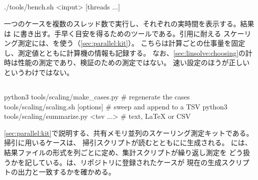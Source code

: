\subsection{}

\begin{shell}
./tools/bench.sh <input> [threads ...]
\end{shell}

一つのケースを複数のスレッド数で実行し、それぞれの実時間を表示する。結果は
に書き出す。手早く目安を得るためのツールである。引用に耐える
スケーリング測定には、を使う（\cref{sec:parallel:kit}）。
こちらは計算ごとの仕事量を固定し、測定値とともに計算機の情報も記録する。
なお、\cref{sec:linsolve:choosing}の計時は性能の測定であり、検証のための測定ではない。
速い設定のほうが正しいというわけではない。

\subsection{}

\begin{shell}
python3 tools/scaling/make_cases.py            # regenerate the cases
tools/scaling/scaling.sh [options]             # sweep and append to a TSV
python3 tools/scaling/summarize.py <tsv ...>   # text, LaTeX or CSV
\end{shell}

\cref{sec:parallel:kit}で説明する、共有メモリ並列のスケーリング測定キットである。掃引に用いるケースは、
掃引スクリプトが読むとともにに生成される。
には、結果ファイルの形式を列ごとに定め、集計スクリプトが繰り返し測定を
どう扱うかを記している。は、リポジトリに登録されたケースが
現在の生成スクリプトの出力と一致するかを確かめる。
